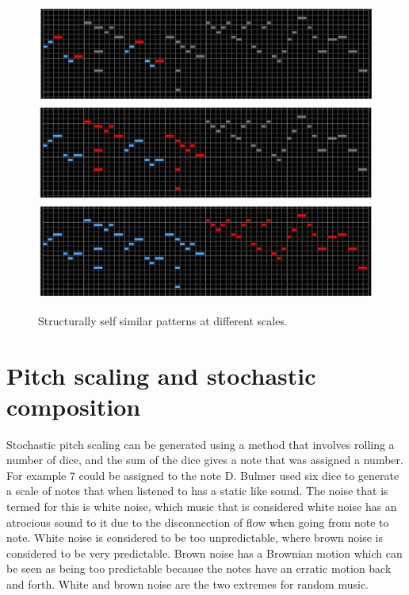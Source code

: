 \documentclass{article}
\begin{document}
\begin{figure}[ht!]
    \centering
    \includegraphics[width=\linewidth]{figures/bach_cello_midi01.png}
    \includegraphics[width=\linewidth]{figures/bach_cello_midi02.png}
    \includegraphics[width=\linewidth]{figures/bach_cello_midi03.png}
    \caption{%
        Structurally self similar patterns at different scales.
    }\label{fig:bach_scale}
\end{figure}

\section{Pitch scaling and stochastic composition}

Stochastic pitch scaling can be generated using a method that involves rolling a
number of dice, and the sum of the dice gives a note that was assigned a number.
For example 7 could be assigned to the note D. Bulmer used six dice to generate
a scale of notes that when listened to has a static like sound. The noise that
is termed for this is white noise, which music that is considered white noise
has an atrocious sound to it due to the disconnection of flow when going from
note to note. White noise is considered to be too unpredictable, where brown
noise is considered to be very predictable. Brown noise has a Brownian motion
which can be seen as being too predictable because the notes have an erratic
motion back and forth. White and brown noise are the two extremes for random
music.
\end{document}
